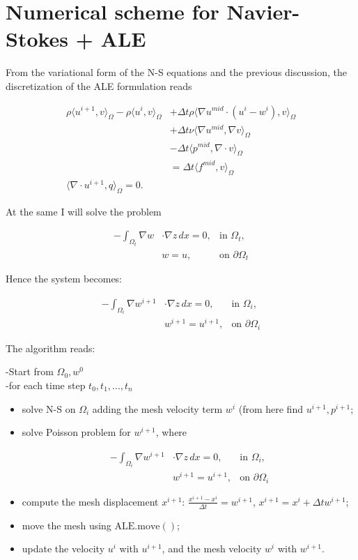 \documentclass[11pt,a4paper,titlepage]{report}
\begin{document}
\section{Numerical scheme for Navier-Stokes + ALE}
From the variational form of the N-S equations and the previous discussion, the discretization of the ALE formulation reads

\[
\begin{aligned}
\rho \langle u^{i+1},v \rangle_\Omega - \rho \langle u^i, v \rangle_\Omega & + \Delta t \rho \langle \nabla u^{mid} \cdot (u^i -w^i)  ,v \rangle_\Omega \\
& + \Delta t \nu \langle \nabla u^{mid}, \nabla v \rangle_\Omega \\
& - \Delta t \langle p^{mid} , \nabla \cdot v \rangle_\Omega \\
& = \Delta t \langle f^{mid} ,v \rangle_\Omega \\
\langle \nabla \cdot u^{i+1},q \rangle_\Omega = 0.
\end{aligned}
\]

At the same I will solve the problem

\[
\begin{aligned}
-  \int_{\Omega_t} \nabla w & \cdot \nabla z \, dx = 0, & \text{in } \Omega_t, \\
& w = u, & \text{on } \partial \Omega_t
\end{aligned}
\]

Hence the system becomes:

\[
\begin{aligned}
-  \int_{\Omega_i} \nabla w^{i+1} & \cdot \nabla z \, dx = 0, & \text{in } \Omega_i, \\
& w^{i+1} = u^{i+1}, & \text{on } \partial \Omega_i
\end{aligned}
\]

The algorithm reads:

-Start from $\Omega_0, w^0$ \\
-for each time step $t_0, t_1, ..., t_n$
\begin{itemize}
\item solve N-S on $\Omega_i$ adding the mesh velocity term $w^i$ (from here find $u^{i+1}, p^{i+1}$;
\item solve Poisson problem for $w^{i+1}$, where 

\[
\begin{aligned}
-  \int_{\Omega_i} \nabla w^{i+1} & \cdot \nabla z \, dx = 0, & \text{in } \Omega_i, \\
& w^{i+1} = u^{i+1}, & \text{on } \partial \Omega_i
\end{aligned}
\]

\item compute the mesh displacement $x^{i+1}$: $\frac{x^{i+1} - x^{i}}{\Delta t} = w^{i+1}$, $x^{i+1} = x^{i} + \Delta t w^{i+1}$;
\item move the mesh using $\mathrm{ALE.move()}$;
\item update the velocity $u^i$ with $u^{i+1}$, and the mesh velocity $w^i$ with $w^{i+1}$.

\end{itemize}
\end{document}

